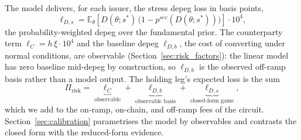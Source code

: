 The model delivers, for each issuer, the stress depeg loss in basis points,
\begin{equation}\label{eq:ellDs}
\ell_{D,s} = \mathbb{E}_\theta\!\left[D(\theta; s^*)\,\bigl(1 - p^{sec}(D(\theta; s^*))\bigr)\right] \cdot 10^4,
\end{equation}
the probability-weighted depeg over the fundamental prior. The counterparty term $\ell_C = h\,\xi\cdot 10^4$ and the baseline depeg $\ell_{D,b}$, the cost of converting under normal conditions, are observable (Section~\ref{sec:risk_factors}): the linear model has zero baseline mid-depeg by construction, so $\ell_{D,b}$ is the observed off-ramp basis rather than a model output. The holding leg's expected loss is the sum
\begin{equation}\label{eq:total_risk_premium}
\Pi_{\text{risk}} = \underbrace{\ell_C}_{\text{observable}} + \underbrace{\ell_{D,b}}_{\text{observable basis}} + \underbrace{\ell_{D,s}}_{\text{closed-form game}},
\end{equation}
which we add to the on-ramp, on-chain, and off-ramp fees of the circuit. Section~\ref{sec:calibration} parametrises the model by observables and contrasts the closed form with the reduced-form evidence.

